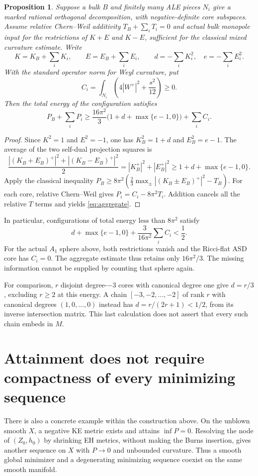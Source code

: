 \documentclass[11pt]{article}
\newtheorem{proposition}{Proposition}
\begin{document}
\begin{proposition}\label{prop:aggregate}
Suppose a bulk $B$ and finitely many ALE pieces $N_i$ give a marked rational
orthogonal decomposition, with negative-definite core subspaces. Assume
relative Chern--Weil additivity $T_B+\sum_iT_i=0$ and actual bulk monopole
input for the restrictions of $K+E$ and $K-E$, sufficient for the classical
mixed curvature estimate. Write
\[
 K=K_B+\sum_iK_i,\qquad E=E_B+\sum_iE_i,\qquad
 d=-\sum_iK_i^2,\quad e=-\sum_iE_i^2.
\]
With the standard operator norm for Weyl curvature, put
\[
 C_i=\int_{N_i}\left(4|W^+|^2+\frac{s^2}{12}\right)\ge0.
\]
Then the total energy of the configuration satisfies
\begin{equation}\label{eq:aggregate}
 P_B+\sum_iP_i\ge
 \frac{16\pi^2}{3}\bigl(1+d+\max\{e-1,0\}\bigr)+\sum_iC_i.
\end{equation}
\end{proposition}
\begin{proof}
Since $K^2=1$ and $E^2=-1$, one has $K_B^2=1+d$ and $E_B^2=e-1$.
The average of the two self-dual projection squares is
\[
 \frac{|(K_B+E_B)^+|^2+|(K_B-E_B)^+|^2}{2}
 =|K_B^+|^2+|E_B^+|^2
 \ge1+d+\max\{e-1,0\}.
\]
Apply the classical inequality
$P_B\ge8\pi^2(\frac23\max_\pm|(K_B\pm E_B)^+|^2-T_B)$.
For each core, relative Chern--Weil gives $P_i=C_i-8\pi^2T_i$.
Addition cancels all the relative $T$ terms and yields
\eqref{eq:aggregate}.
\end{proof}

In particular, configurations of total energy less than $8\pi^2$ satisfy
\[
 d+\max\{e-1,0\}+\frac{3}{16\pi^2}\sum_iC_i<\frac12.
\]
For the actual $A_1$ sphere above, both restrictions vanish and the
Ricci-flat ASD core has $C_i=0$. The aggregate estimate thus retains only
$16\pi^2/3$. The missing information cannot be supplied by counting that
sphere again.

For comparison, $r$ disjoint degree-$-3$ cores with canonical degree one
give $d=r/3$, excluding $r\ge2$ at this energy. A chain
$[-3,-2,\ldots,-2]$ of rank $r$ with canonical degrees $(1,0,\ldots,0)$
instead has $d=r/(2r+1)<1/2$, from its inverse intersection matrix.
This last calculation does not assert that every such chain embeds in $M$.

\section{Attainment does not require compactness of every minimizing sequence}
There is also a concrete example within the construction above. On the
unblown smooth $X$, a negative KE metric exists and attains $\inf P=0$.
Resolving the node of $(Z_0,h_0)$ by shrinking EH metrics, without making
the Burns insertion, gives another sequence on $X$ with $P\to0$ and
unbounded curvature. Thus a smooth global minimizer and a degenerating
minimizing sequence coexist on the same smooth manifold.
\end{document}
